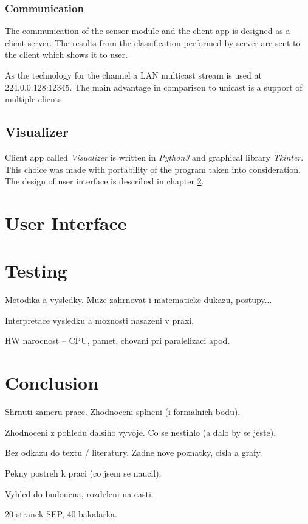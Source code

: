 \subsection*{Communication}
\label{CollVisuComm}
The communication of the sensor module and the client app is designed as a client-server. The results
from the classification performed by server are sent to the client which shows it to user.

As the technology for the channel a LAN multicast stream is used at 224.0.0.128:12345.
The main advantage in comparison to unicast is a support of multiple clients.

\section{Visualizer}
Client app called {\it Visualizer} is written in {\it Python3} and graphical library {\it Tkinter}.
This choice was made with portability of the program taken into consideration.
The design of user interface is described in chapter \ref{Label:UI}.






\chapter{User Interface}
\label{Label:UI}



\chapter{Testing}
Metodika a vysledky. Muze zahrnovat i matematicke dukazu, postupy...

Interpretace vysledku a moznosti nasazeni v praxi.

HW narocnost -- CPU, pamet, chovani pri paralelizaci apod.




\chapter{Conclusion}
Shrnuti zameru prace. Zhodnoceni splneni (i formalnich bodu).

Zhodnoceni z pohledu dalsiho vyvoje. Co se nestihlo (a dalo by se jeste).

Bez odkazu do textu / literatury. Zadne nove poznatky, cisla a grafy.

Pekny postreh k praci (co jsem se naucil).

Vyhled do budoucna, rozdeleni na casti.

20 stranek SEP, 40 bakalarka.




